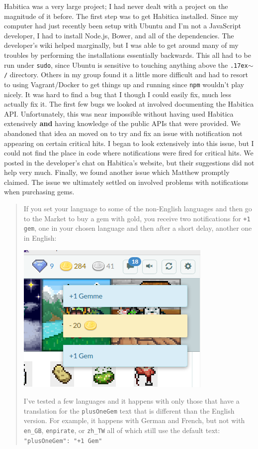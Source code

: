 \documentclass[12pt]{article}
\begin{document}
Habitica was a very large project; I had never dealt with a project on the magnitude of it before. The first step was to get Habitica installed. Since my computer had just recently been setup with Ubuntu and I'm not a JavaScript developer, I had to install Node.js, Bower, and all of the dependencies. The developer's wiki helped marginally, but I was able to get around many of my troubles by performing the installations essentially backwards. This all had to be run under \texttt{sudo}, since Ubuntu is sensitive to touching anything above the \texttt{{\raise.17ex\hbox{$\scriptstyle\sim$}}/} directory. Others in my group found it a little more difficult and had to resort to using Vagrant/Docker to get things up and running since \texttt{npm} wouldn't play nicely. It was hard to find a bug that I though I could easily fix, much less actually fix it. The first few bugs we looked at involved documenting the Habitica API. Unfortunately, this was near impossible without having used Habitica extensively \textbf{and} having knowledge of the public APIs that were provided. We abandoned that idea an moved on to try and fix an issue with notification not appearing on certain critical hits. I began to look extensively into this issue, but I could not find the place in code where notifications were fired for critical hits. We posted in the developer's chat on Habitica's website, but their suggestions did not help very much. Finally, we found another issue which Matthew promptly claimed. The issue we ultimately settled on involved problems with notifications when purchasing gems.
\begin{quote}
    If you set your language to some of the non-English languages and then go to the Market to buy a gem with gold, you receive two notifications for \texttt{+1 gem}, one in your chosen language and then after a short delay, another one in English:
    \begin{center}
        \includegraphics[scale=0.4]{issue}
    \end{center}
    I've tested a few languages and it happens with only those that have a translation for the \texttt{plusOneGem} text that is different than the English version. For example, it happens with German and French, but not with \texttt{en\_GB}, \texttt{en\MVAt pirate}, or \texttt{zh\_TW} all of which still use the default text: \texttt{"plusOneGem": "+1 Gem"}
\end{quote}
\end{document}
